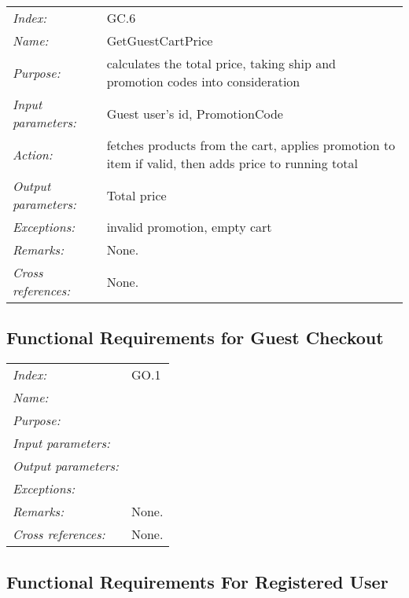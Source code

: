\documentclass[10pt,letter]{article}
\begin{document}
\begin{tabularx}{\textwidth}{l X}
    \it{Index:} & GC.6 \\
    \it{Name:} & GetGuestCartPrice \\
    \it{Purpose:} & calculates the total price, taking ship and promotion codes into consideration \\
    \it{Input parameters:} & Guest user's id, PromotionCode \\
    \it{Action:} &  fetches products from the cart, applies promotion to item if valid, then adds price to running total\\
    \it{Output parameters:} & Total price  \\
    \it{Exceptions:} &  invalid promotion, empty cart\\
    \it{Remarks:} & None. \\
    \it{Cross references:} & None. \\
    \hline
\end{tabularx}

\subsection{Functional Requirements for Guest Checkout}

\begin{tabularx}{\textwidth}{l X}
    \it{Index:} & GO.1 \\
    \it{Name:} & \\
    \it{Purpose:} & \\
    \it{Input parameters:} & \\
    \it{Output parameters:} &  \\
    \it{Exceptions:} &  \\
    \it{Remarks:} & None. \\
    \it{Cross references:} & None. \\
    \hline
\end{tabularx}

\subsection{Functional Requirements For Registered User}
\end{document}
